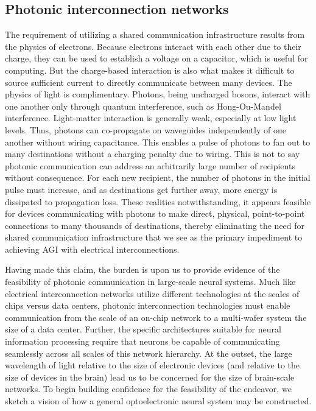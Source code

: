 \documentclass[twocolumn]{article}
\begin{document}
\subsection{\label{sec:photonicInterconnectionNetworks}Photonic interconnection networks}
The requirement of utilizing a shared communication infrastructure results from the physics of electrons. Because electrons interact with each other due to their charge, they can be used to establish a voltage on a capacitor, which is useful for computing. But the charge-based interaction is also what makes it difficult to source sufficient current to directly communicate between many devices. The physics of light is complimentary. Photons, being uncharged bosons, interact with one another only through quantum interference, such as Hong-Ou-Mandel interference. Light-matter interaction is generally weak, especially at low light levels. Thus, photons can co-propagate on waveguides independently of one another without wiring capacitance. This enables a pulse of photons to fan out to many destinations without a charging penalty due to wiring. This is not to say photonic communication can address an arbitrarily large number of recipients without consequence. For each new recipient, the number of photons in the initial pulse must increase, and as destinations get further away, more energy is dissipated to propagation loss. These realities notwithstanding, it appears feasible for devices communicating with photons to make direct, physical, point-to-point connections to many thousands of destinations, thereby eliminating the need for shared communication infrastructure that we see as the primary impediment to achieving AGI with electrical interconnections.

Having made this claim, the burden is upon us to provide evidence of the feasibility of photonic communication in large-scale neural systems. Much like electrical interconnection networks utilize different technologies at the scales of chips versus data centers, photonic interconnection technologies must enable communication from the scale of an on-chip network to a multi-wafer system the size of a data center. Further, the specific architectures suitable for neural information processing require that neurons be capable of communicating seamlessly across all scales of this network hierarchy. At the outset, the large wavelength of light relative to the size of electronic devices (and relative to the size of devices in the brain)  lead us to be concerned for the size of brain-scale networks. To begin building confidence for the feasibility of the endeavor, we sketch a vision of how a general optoelectronic neural system may be constructed.
\end{document}
